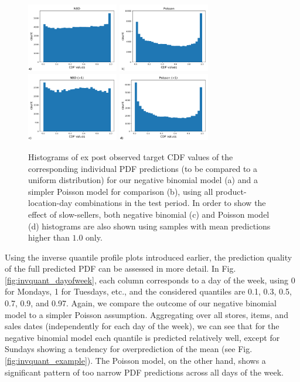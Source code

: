 \documentclass[BCOR=1mm, DIV=calc,10pt,
twoside=true,
twocolumn,
headings=normal]{scrartcl}
\newcommand{\fig}{Fig.}
\begin{document}
\begin{figure}
\begin{center}
\includegraphics[width=4cm]{../figures/cdf_truth_nbinom}
\includegraphics[width=4cm]{../figures/cdf_truth_poisson}
\includegraphics[width=4cm]{../figures/cdf_truth_nbinom_larger1}
\includegraphics[width=4cm]{../figures/cdf_truth_poisson_larger1}
\caption{\label{fig:cdf_demand} Histograms of ex post observed target CDF values of the corresponding individual PDF predictions (to be compared to a uniform distribution) for our negative binomial model (a) and a simpler Poisson model for comparison (b), using all product-location-day combinations in the test period. In order to show the effect of slow-sellers, both negative binomial (c) and Poisson model (d) histograms are also shown using samples with mean predictions higher than $1.0$ only.}
\end{center}
\end{figure}

Using the inverse quantile profile plots introduced earlier, the prediction quality of the full predicted PDF can be assessed in more detail. In \fig \ref{fig:invquant_dayofweek}, each column corresponds to a day of the week, using 0 for Mondays, 1 for Tuesdays, etc., and the considered quantiles are 0.1, 0.3, 0.5, 0.7, 0.9, and 0.97. Again, we compare the outcome of our negative binomial model to a simpler Poisson assumption. Aggregating over all stores, items, and sales dates (independently for each day of the week), we can see that for the negative binomial model each quantile is predicted relatively well, except for Sundays showing a tendency for overprediction of the mean (see \fig \ref{fig:invquant_example}). The Poisson model, on the other hand, shows a significant pattern of too narrow PDF predictions across all days of the week.
\end{document}

